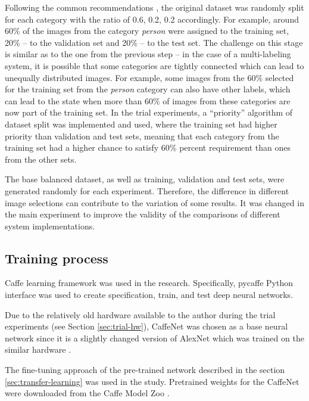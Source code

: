     Following the common recommendations \cite{Ng2016NutsLearning}, the original dataset was randomly split for each category with the ratio of 0.6, 0.2, 0.2 accordingly. For example, around 60\% of the images from the category \textit{person} were assigned to the training set, 20\% -- to the validation set and 20\% -- to the test set. The challenge on this stage is similar as to the one from the previous step -- in the case of a multi-labeling system, it is possible that some categories are tightly connected which can lead to unequally distributed images. For example, some images from the 60\% selected for the training set from the \textit{person} category can also have other labels, which can lead to the state when more than 60\% of images from these categories are now part of the training set. In the trial experiments, a ``priority'' algorithm of dataset split was implemented and used, where the training set had higher priority than validation and test sets, meaning that each category from the training set had a higher chance to satisfy 60\% percent requirement than ones from the other sets.
    
    The base balanced dataset, as well as training, validation and test sets, were generated randomly for each experiment. Therefore, the difference in different image selections can contribute to the variation of some results. It was changed in the main experiment to improve the validity of the comparisons of different system implementations.
    
    \subsection{Training process}
    \label{sec:trial-training}
    Caffe \cite{Caffe} learning framework was used in the research. Specifically, pycaffe \cite{pycaffe} Python interface was used to create specification, train, and test deep neural networks.
    
    Due to the relatively old hardware available to the author during the trial experiments (see Section \ref{sec:trial-hw}), CaffeNet \cite{CaffeNet} was chosen as a base neural network since it is a slightly changed version of AlexNet which was trained on the similar hardware \cite{Krizhevsky2012ImageNetDNN}.
    
    The fine-tuning approach of the pre-trained network described in the section \ref{sec:transfer-learning} was used in the study. Pretrained weights for the CaffeNet were downloaded from the Caffe Model Zoo \cite{CaffeModelZoo}.
    
